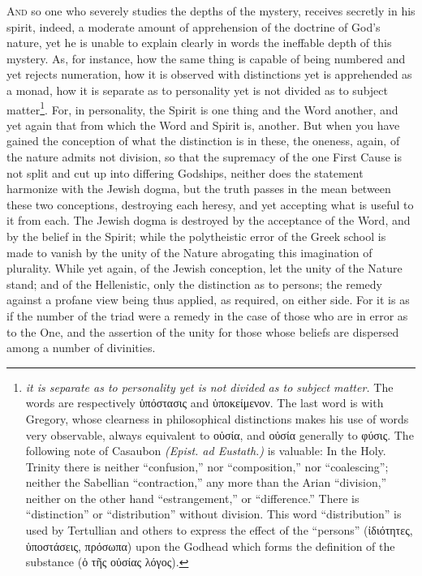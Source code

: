 \textsc{And} so one who severely studies the depths of the mystery, receives secretly in his spirit, indeed, a moderate amount of apprehension of the doctrine of God’s nature, yet he is unable to explain clearly in words the ineffable depth of this mystery. As, for instance, how the same thing is capable of being numbered and yet rejects numeration, how it is observed with distinctions yet is apprehended as a monad, how it is separate as to personality yet is not divided as to subject matter\footnote{\emph{it is separate as to personality yet is not divided as to subject matter.} The words are respectively \textgreek{ὑπόστασις} and \textgreek{ὑποκείμενον}. The last word is with Gregory, whose clearness in philosophical distinctions makes his use of words very observable, always equivalent to \textgreek{οὐσία}, and \textgreek{οὐσία} generally to \textgreek{φύσις}. The following note of Casaubon \emph{(Epist. ad Eustath.)} is valuable: In the Holy. Trinity there is neither “confusion,” nor “composition,” nor “coalescing”; neither the Sabellian “contraction,” any more than the Arian “division,” neither on the other hand “estrangement,” or “difference.” There is “distinction” or “distribution” without division. This word “distribution” is used by Tertullian and others to express the effect of the “persons” (\textgreek{ἰδιότητες, ὑποστάσεις, πρόσωπα}) upon the Godhead which forms the definition of the substance (\textgreek{ὁ τῆς οὐσίας λόγος}).}. For, in personality, the Spirit is one thing and the Word another, and yet again that from which the Word and Spirit is, another. But when you have gained the conception of what the distinction is in these, the oneness, again, of the nature admits not division, so that the supremacy of the one First Cause is not split and cut up into differing Godships, neither does the statement harmonize with the Jewish dogma, but the truth passes in the mean between these two conceptions, destroying each heresy, and yet accepting what is useful to it from each. The Jewish dogma is destroyed by the acceptance of the Word, and by the belief in the Spirit; while the polytheistic error of the Greek school is made to vanish by the unity of the Nature abrogating this imagination of plurality. While yet again, of the Jewish conception, let the unity of the Nature stand; and of the Hellenistic, only the distinction as to persons; the remedy against a profane view being thus applied, as required, on either side. For it is as if the number of the triad were a remedy in the case of those who are in error as to the One, and the assertion of the unity for those whose beliefs are dispersed among a number of divinities.

